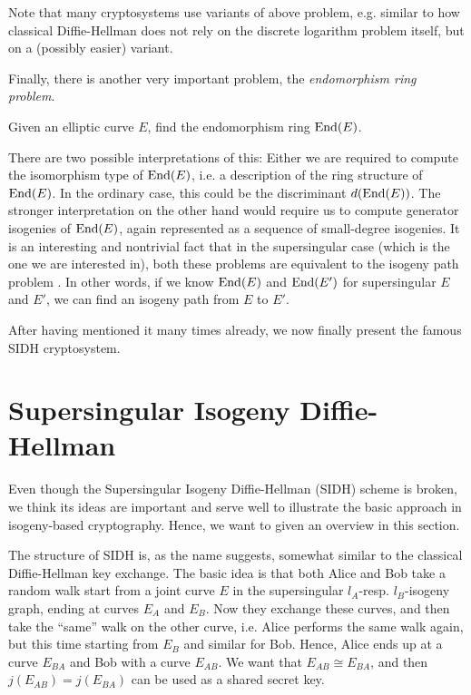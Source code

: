 Note that many cryptosystems use variants of above problem, e.g. similar to how classical Diffie-Hellman does not rely on the discrete logarithm problem itself, but on a (possibly easier) variant.

Finally, there is another very important problem, the \emph{endomorphism ring problem}.
\begin{problem}
    Given an elliptic curve $E$, find the endomorphism ring $\mathrm{End}(E)$.
\end{problem}
There are two possible interpretations of this:
Either we are required to compute the isomorphism type of $\mathrm{End}(E)$, i.e. a description of the ring structure of $\mathrm{End}(E)$.
In the ordinary case, this could be the discriminant $d(\mathrm{End}(E))$.
The stronger interpretation on the other hand would require us to compute generator isogenies of $\mathrm{End}(E)$, again represented as a sequence of small-degree isogenies.
It is an interesting and nontrivial fact that in the supersingular case (which is the one we are interested in), both these problems are equivalent to the isogeny path problem \cite{endomorphism_ring_isogeny_path_equivalent}.
In other words, if we know $\mathrm{End}(E)$ and $\mathrm{End}(E')$ for supersingular $E$ and $E'$, we can find an isogeny path from $E$ to $E'$.

After having mentioned it many times already, we now finally present the famous SIDH cryptosystem.

\section{Supersingular Isogeny Diffie-Hellman}
Even though the Supersingular Isogeny Diffie-Hellman (SIDH) scheme is broken, we think its ideas are important and serve well to illustrate the basic approach in isogeny-based cryptography.
Hence, we want to given an overview in this section.

The structure of SIDH is, as the name suggests, somewhat similar to the classical Diffie-Hellman key exchange.
The basic idea is that both Alice and Bob take a random walk start from a joint curve $E$ in the supersingular $l_A$-resp. $l_B$-isogeny graph, ending at curves $E_A$ and $E_B$.
Now they exchange these curves, and then take the ``same'' walk on the other curve, i.e. Alice performs the same walk again, but this time starting from $E_B$ and similar for Bob.
Hence, Alice ends up at a curve $E_{BA}$ and Bob with a curve $E_{AB}$.
We want that $E_{AB} \cong E_{BA}$, and then $j(E_{AB}) = j(E_{BA})$ can be used as a shared secret key.

